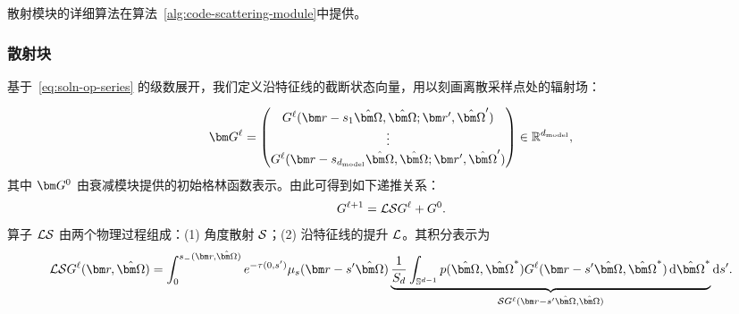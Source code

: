 \noindent 散射模块的详细算法在算法~\ref{alg:code-scattering-module}中提供。






\subsubsection{散射块}
基于~\eqref{eq:soln-op-series} 的级数展开，我们定义沿特征线的截断状态向量，用以刻画离散采样点处的辐射场：

\begin{equation}
    \bG^{\ell} =
    \begin{pmatrix}
        G^\ell(\br-s_1 \bOmega, \bOmega; \br', \bOmega') \\
        \vdots                                           \\
        G^\ell(\br-s_{d_{\text{model}}} \bOmega, \bOmega; \br', \bOmega')
    \end{pmatrix}\in \mathbb{R}^{d_{\text{model}}},
\end{equation}
其中 $\bG^0$ 由衰减模块提供的初始格林函数表示。由此可得到如下递推关系：
\begin{equation}
    G^{\ell+1} = \mathcal{L}\mathcal{S} G^\ell + G^0.
\end{equation}
算子 $\mathcal{L}\mathcal{S}$ 由两个物理过程组成：(1) 角度散射 $\mathcal{S}$；(2) 沿特征线的提升 $\mathcal{L}$。其积分表示为
\begin{equation}\label{LS}
    \cL\cS G^{\ell}(\br, \bOmega) = \int_0^{s_{-}(\br, \bOmega)} e^{-\tau(0,s')}
    \mus(\br-s' \bOmega) \underbrace{\frac{1}{S_d} \int_{\sS^{d-1}}
        p(\bOmega, \bOmega^*) G^{\ell}(\br-s' \bOmega, \bOmega^*)
        \diff{\bOmega^*}}_{\cS G^{\ell}(\br-s' \bOmega, \bOmega)} \diff{s'}.
\end{equation}

